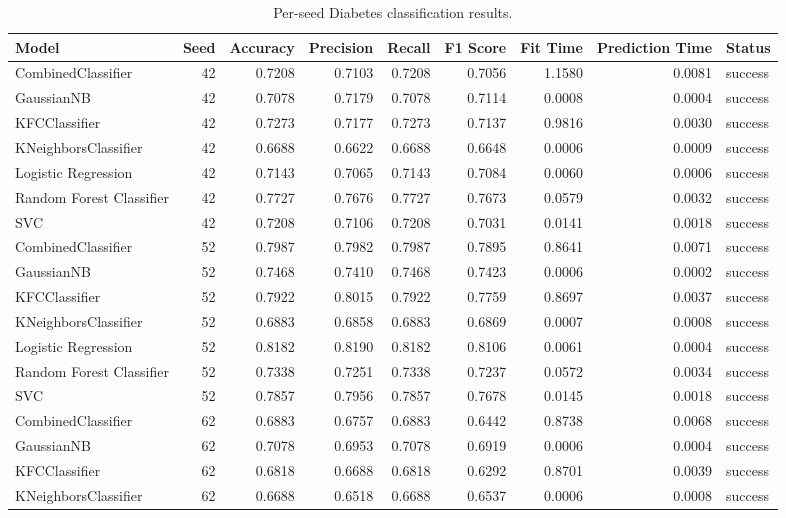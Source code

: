\begin{table}
\caption{Per-seed Diabetes classification results.}
\label{tab:diabetes_per_seed_results}
\begin{tabular}{lrrrrrrrl}
\toprule
Model & Seed & Accuracy & Precision & Recall & F1 Score & Fit Time & Prediction Time & Status \\
\midrule
CombinedClassifier & 42 & 0.7208 & 0.7103 & 0.7208 & 0.7056 & 1.1580 & 0.0081 & success \\
GaussianNB & 42 & 0.7078 & 0.7179 & 0.7078 & 0.7114 & 0.0008 & 0.0004 & success \\
KFCClassifier & 42 & 0.7273 & 0.7177 & 0.7273 & 0.7137 & 0.9816 & 0.0030 & success \\
KNeighborsClassifier & 42 & 0.6688 & 0.6622 & 0.6688 & 0.6648 & 0.0006 & 0.0009 & success \\
Logistic Regression & 42 & 0.7143 & 0.7065 & 0.7143 & 0.7084 & 0.0060 & 0.0006 & success \\
Random Forest Classifier & 42 & 0.7727 & 0.7676 & 0.7727 & 0.7673 & 0.0579 & 0.0032 & success \\
SVC & 42 & 0.7208 & 0.7106 & 0.7208 & 0.7031 & 0.0141 & 0.0018 & success \\
CombinedClassifier & 52 & 0.7987 & 0.7982 & 0.7987 & 0.7895 & 0.8641 & 0.0071 & success \\
GaussianNB & 52 & 0.7468 & 0.7410 & 0.7468 & 0.7423 & 0.0006 & 0.0002 & success \\
KFCClassifier & 52 & 0.7922 & 0.8015 & 0.7922 & 0.7759 & 0.8697 & 0.0037 & success \\
KNeighborsClassifier & 52 & 0.6883 & 0.6858 & 0.6883 & 0.6869 & 0.0007 & 0.0008 & success \\
Logistic Regression & 52 & 0.8182 & 0.8190 & 0.8182 & 0.8106 & 0.0061 & 0.0004 & success \\
Random Forest Classifier & 52 & 0.7338 & 0.7251 & 0.7338 & 0.7237 & 0.0572 & 0.0034 & success \\
SVC & 52 & 0.7857 & 0.7956 & 0.7857 & 0.7678 & 0.0145 & 0.0018 & success \\
CombinedClassifier & 62 & 0.6883 & 0.6757 & 0.6883 & 0.6442 & 0.8738 & 0.0068 & success \\
GaussianNB & 62 & 0.7078 & 0.6953 & 0.7078 & 0.6919 & 0.0006 & 0.0004 & success \\
KFCClassifier & 62 & 0.6818 & 0.6688 & 0.6818 & 0.6292 & 0.8701 & 0.0039 & success \\
KNeighborsClassifier & 62 & 0.6688 & 0.6518 & 0.6688 & 0.6537 & 0.0006 & 0.0008 & success \\

\end{tabular}
\end{table}
